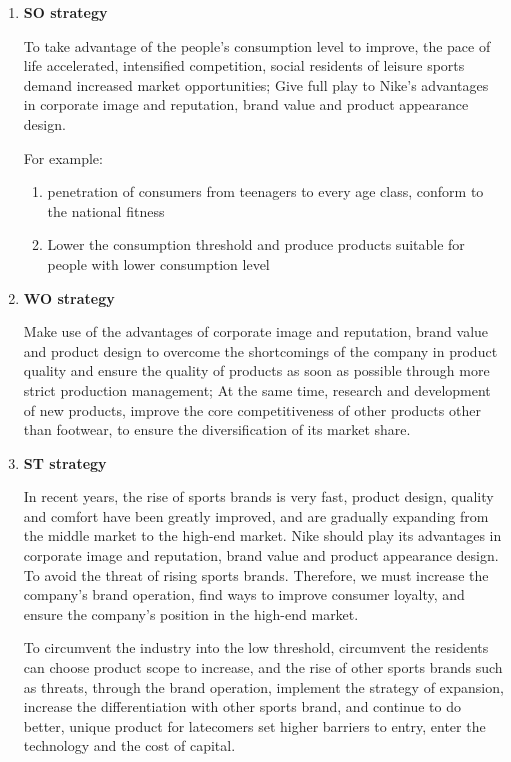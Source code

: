 \documentclass[a4paper, 12pt]{report}
\begin{document}
\begin{enumerate}
    \item \textbf{SO strategy} \par To take advantage of the people's consumption level to improve, the pace of life accelerated, intensified competition, social residents of leisure sports demand increased market opportunities; Give full play to Nike's advantages in corporate image and reputation, brand value and product appearance design. 
    \par For example: 
    \begin{enumerate}
        \item penetration of consumers from teenagers to every age class, conform to the national fitness
        \item Lower the consumption threshold and produce products suitable for people with lower consumption level
    \end{enumerate}
    \item \textbf{WO strategy} \par Make use of the advantages of corporate image and reputation, brand value and product design to overcome the shortcomings of the company in product quality and ensure the quality of products as soon as possible through more strict production management; At the same time, research and development of new products, improve the core competitiveness of other products other than footwear, to ensure the diversification of its market share.
    \item \textbf{ST strategy} \par In recent years, the rise of sports brands is very fast, product design, quality and comfort have been greatly improved, and are gradually expanding from the middle market to the high-end market. Nike should play its advantages in corporate image and reputation, brand value and product appearance design. To avoid the threat of rising sports brands. Therefore, we must increase the company's brand operation, find ways to improve consumer loyalty, and ensure the company's position in the high-end market.\par
    To circumvent the industry into the low threshold, circumvent the residents can choose product scope to increase, and the rise of other sports brands such as threats, through the brand operation, implement the strategy of expansion, increase the differentiation with other sports brand, and continue to do better, unique product for latecomers set higher barriers to entry, enter the technology and the cost of capital.

\end{enumerate}
\end{document}
